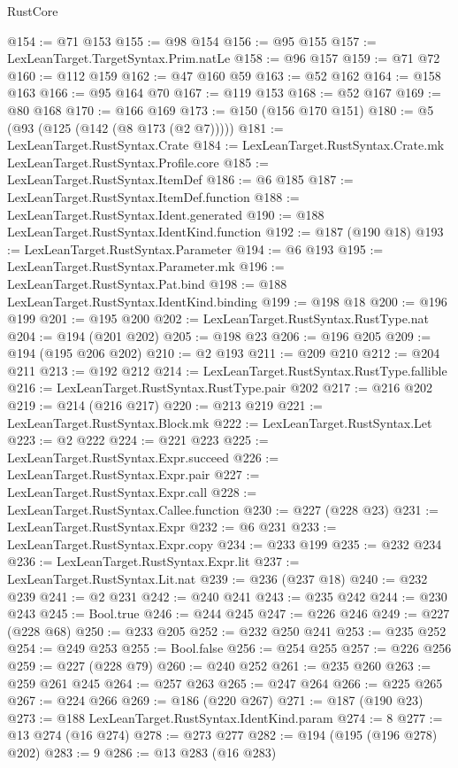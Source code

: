 \begin{lexlean}{RustCore}
\begin{coremodule}
@154 := @71 @153
@155 := @98 @154
@156 := @95 @155
@157 := LexLeanTarget.TargetSyntax.Prim.natLe
@158 := @96 @157
@159 := @71 @72
@160 := @112 @159
@162 := @47 @160 @59
@163 := @52 @162
@164 := @158 @163
@166 := @95 @164 @70
@167 := @119 @153
@168 := @52 @167
@169 := @80 @168
@170 := @166 @169
@173 := @150 (@156 @170 @151)
@180 := @5 (@93 (@125 (@142 (@8 @173 (@2 @7)))))
@181 := LexLeanTarget.RustSyntax.Crate
@184 := LexLeanTarget.RustSyntax.Crate.mk LexLeanTarget.RustSyntax.Profile.core
@185 := LexLeanTarget.RustSyntax.ItemDef
@186 := @6 @185
@187 := LexLeanTarget.RustSyntax.ItemDef.function
@188 := LexLeanTarget.RustSyntax.Ident.generated
@190 := @188 LexLeanTarget.RustSyntax.IdentKind.function
@192 := @187 (@190 @18)
@193 := LexLeanTarget.RustSyntax.Parameter
@194 := @6 @193
@195 := LexLeanTarget.RustSyntax.Parameter.mk
@196 := LexLeanTarget.RustSyntax.Pat.bind
@198 := @188 LexLeanTarget.RustSyntax.IdentKind.binding
@199 := @198 @18
@200 := @196 @199
@201 := @195 @200
@202 := LexLeanTarget.RustSyntax.RustType.nat
@204 := @194 (@201 @202)
@205 := @198 @23
@206 := @196 @205
@209 := @194 (@195 @206 @202)
@210 := @2 @193
@211 := @209 @210
@212 := @204 @211
@213 := @192 @212
@214 := LexLeanTarget.RustSyntax.RustType.fallible
@216 := LexLeanTarget.RustSyntax.RustType.pair @202
@217 := @216 @202
@219 := @214 (@216 @217)
@220 := @213 @219
@221 := LexLeanTarget.RustSyntax.Block.mk
@222 := LexLeanTarget.RustSyntax.Let
@223 := @2 @222
@224 := @221 @223
@225 := LexLeanTarget.RustSyntax.Expr.succeed
@226 := LexLeanTarget.RustSyntax.Expr.pair
@227 := LexLeanTarget.RustSyntax.Expr.call
@228 := LexLeanTarget.RustSyntax.Callee.function
@230 := @227 (@228 @23)
@231 := LexLeanTarget.RustSyntax.Expr
@232 := @6 @231
@233 := LexLeanTarget.RustSyntax.Expr.copy
@234 := @233 @199
@235 := @232 @234
@236 := LexLeanTarget.RustSyntax.Expr.lit
@237 := LexLeanTarget.RustSyntax.Lit.nat
@239 := @236 (@237 @18)
@240 := @232 @239
@241 := @2 @231
@242 := @240 @241
@243 := @235 @242
@244 := @230 @243
@245 := Bool.true
@246 := @244 @245
@247 := @226 @246
@249 := @227 (@228 @68)
@250 := @233 @205
@252 := @232 @250 @241
@253 := @235 @252
@254 := @249 @253
@255 := Bool.false
@256 := @254 @255
@257 := @226 @256
@259 := @227 (@228 @79)
@260 := @240 @252
@261 := @235 @260
@263 := @259 @261 @245
@264 := @257 @263
@265 := @247 @264
@266 := @225 @265
@267 := @224 @266
@269 := @186 (@220 @267)
@271 := @187 (@190 @23)
@273 := @188 LexLeanTarget.RustSyntax.IdentKind.param
@274 := 8
@277 := @13 @274 (@16 @274)
@278 := @273 @277
@282 := @194 (@195 (@196 @278) @202)
@283 := 9
@286 := @13 @283 (@16 @283)

\end{coremodule}
\end{lexlean}

